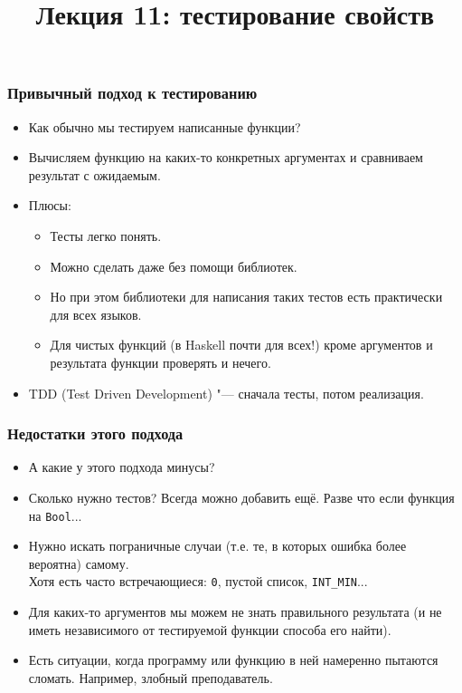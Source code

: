 \documentclass[11pt]{beamer}
\title{Лекция 11: тестирование свойств}
\begin{document}
    \begin{frame}[plain]
    \maketitle
\end{frame}

\begin{frame}[fragile]
\frametitle{Привычный подход к тестированию}
\begin{itemize}
    \item Как обычно мы тестируем написанные функции?
    \pause
    \item Вычисляем функцию на каких-то конкретных аргументах и сравниваем результат с ожидаемым.
    \item Плюсы:
    \pause
    \begin{itemize}
        \item Тесты легко понять.
        \item Можно сделать даже без помощи библиотек.
        \item Но при этом библиотеки для написания таких тестов есть практически для всех языков.
        \item Для чистых функций (в Haskell почти для всех!) кроме аргументов и результата функции проверять и нечего.
    \end{itemize}
    \pause
    \item TDD (Test Driven Development) \pause "--- сначала тесты, потом реализация.
\end{itemize}
\end{frame}

\begin{frame}[fragile]
\frametitle{Недостатки этого подхода}
\begin{itemize}
    \item А какие у этого подхода минусы?
    \pause
    \item Сколько нужно тестов? Всегда можно добавить ещё.
    \pause
    Разве что если функция на \lstinline|Bool|...
    \pause
    \item Нужно искать пограничные случаи (т.е. те, в которых ошибка более вероятна) самому. \\
    Хотя есть часто встречающиеся: \pause \lstinline|0|, пустой список, \lstinline|INT_MIN|...
    \pause
    \item Для каких-то аргументов мы можем не знать правильного результата (и не иметь независимого от тестируемой функции способа его найти).
    \pause
    \item Есть ситуации, когда программу или функцию в ней намеренно пытаются сломать. \pause Например, злобный преподаватель.
\end{itemize}
\end{frame}
\end{document}

